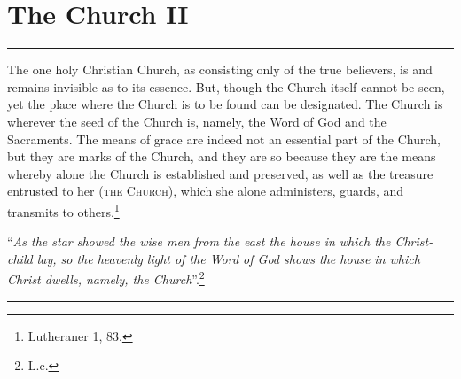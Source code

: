\chapter{The Church II}

\hrule
\vspace{.30cm}

The one holy Christian Church, as consisting only of the true believers, is and remains invisible as to its essence.  But, though the Church itself cannot be seen, yet the place where the Church is to be found can be designated.  The Church is wherever the seed of the Church is, namely, the Word of God and the Sacraments.  The means of grace are indeed not an essential part of the Church, but they are marks of the Church, and they are so because they are the means whereby alone the Church is established and preserved, as well as the treasure entrusted to her {\scriptsize\textsc{(the Church)}}, which she alone administers, guards, and transmits to others.\footnote{Lutheraner 1, 83.} \begin{displayquote} “\textit{As the star showed the wise men from the east the house in which the Christ-child lay, so the heavenly light of the Word of God shows the house in which Christ dwells, namely, the Church}”.\footnote{L.c.}\end{displayquote}
\vspace{.30cm}
\hrule
\vspace{1.25cm}
